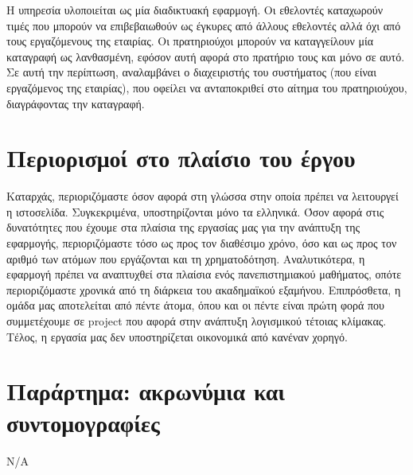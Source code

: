 \documentclass[a4paper,oneside, 12pt]{article}
\begin{document}
Η υπηρεσία υλοποιείται ως μία διαδικτυακή εφαρμογή. Οι εθελοντές
καταχωρούν τιμές που μπορούν να επιβεβαιωθούν ως έγκυρες από άλλους
εθελοντές αλλά όχι από τους εργαζόμενους της εταιρίας. Οι πρατηριούχοι
μπορούν να καταγγείλουν μία καταγραφή ως λανθασμένη, εφόσον αυτή αφορά
στο πρατήριο τους και μόνο σε αυτό. Σε αυτή την περίπτωση, αναλαμβάνει ο
διαχειριστής του συστήματος (που είναι εργαζόμενος της εταιρίας), που οφείλει
να ανταποκριθεί στο αίτημα του πρατηριούχου, διαγράφοντας την καταγραφή.

\section{Περιορισμοί στο πλαίσιο του έργου}

Καταρχάς, περιοριζόμαστε όσον αφορά στη γλώσσα στην οποία πρέπει να
λειτουργεί η ιστοσελίδα. Συγκεκριμένα, υποστηρίζονται μόνο τα ελληνικά.
Όσον αφορά στις δυνατότητες που έχουμε στα πλαίσια της εργασίας μας για
την ανάπτυξη της εφαρμογής, περιοριζόμαστε τόσο ως προς τον διαθέσιμο
χρόνο, όσο και ως προς τον αριθμό των ατόμων που εργάζονται και τη
χρηματοδότηση. Αναλυτικότερα, η εφαρμογή πρέπει να αναπτυχθεί στα πλαίσια
ενός πανεπιστημιακού μαθήματος, οπότε περιοριζόμαστε χρονικά από τη
διάρκεια του ακαδημαϊκού εξαμήνου. Επιπρόσθετα, η ομάδα μας αποτελείται
από πέντε άτομα, όπου και οι πέντε είναι πρώτη φορά που συμμετέχουμε σε
project που αφορά στην ανάπτυξη λογισμικού τέτοιας κλίμακας. Τέλος, η
εργασία μας δεν υποστηρίζεται οικονομικά από κανέναν χορηγό.

\section{Παράρτημα: ακρωνύμια και συντομογραφίες}

Ν/Α
\end{document}
